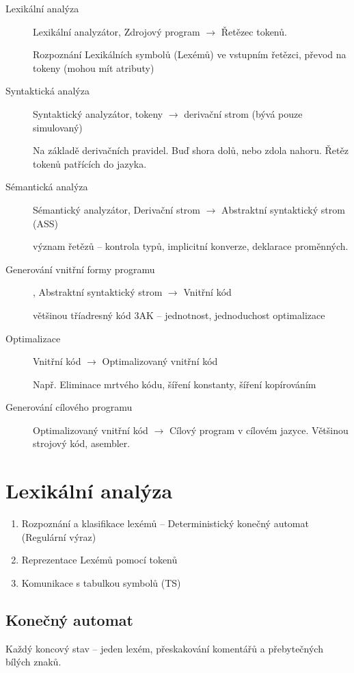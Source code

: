 \documentclass[a4wide]{report}
\begin{document}
\begin{description}
	\item[Lexikální analýza] Lexikální analyzátor, Zdrojový program $\to$ Řetězec tokenů. 
	
	Rozpoznání Lexikálních symbolů (Lexémů) ve vstupním řetězci, převod na tokeny (mohou mít atributy)
	\item[Syntaktická analýza] Syntaktický analyzátor, tokeny $\to$ derivační strom (bývá pouze simulovaný)
	
	Na základě derivačních pravidel. Buď shora dolů, nebo zdola nahoru. Řetěz tokenů patřících do jazyka.
	\item[Sémantická analýza] Sémantický analyzátor, Derivační strom $\to$ Abstraktní syntaktický strom (ASS)
	
	význam řetězů -- kontrola typů, implicitní konverze, deklarace proměnných.
	\item[Generování vnitřní formy programu], Abstraktní syntaktický strom $\to$ Vnitřní kód
	
	většinou tříadresný kód 3AK -- jednotnost, jednoduchost optimalizace
	\item[Optimalizace] Vnitřní kód $\to$ Optimalizovaný vnitřní kód
	
	Např. Eliminace mrtvého kódu, šíření konstanty, šíření kopírováním
	\item[Generování cílového programu] Optimalizovaný vnitřní kód $\to$ Cílový program v cílovém jazyce. Většinou strojový kód, asembler.
\end{description}

\section{Lexikální analýza}

\begin{enumerate}
	\item Rozpoznání a klasifikace lexémů -- Deterministický konečný automat (Regulární výraz)
	\item Reprezentace Lexémů pomocí tokenů
	\item Komunikace s tabulkou symbolů (TS)
\end{enumerate}

\subsection{Konečný automat}
Každý koncový stav -- jeden lexém, přeskakování komentářů a přebytečných bílých znaků.
\end{document}
